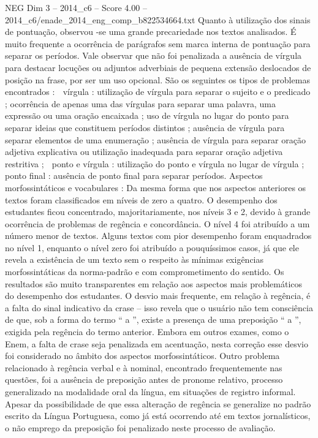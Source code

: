 \begin{textsample}{NEG Dim 3 – 2014\_c6 – Score 4.00 – 2014\_c6/enade\_2014\_eng\_comp\_b822534664.txt}
Quanto à utilização dos sinais de pontuação, observou -se uma grande precariedade nos textos analisados.
É muito frequente a ocorrência de parágrafos sem marca interna de pontuação para separar os períodos.
Vale observar que não foi penalizada a ausência de vírgula para destacar locuções ou adjuntos adverbiais de pequena extensão deslocados de posição na frase, por ser um uso opcional.
São os seguintes os tipos de problemas encontrados :  vírgula : utilização de vírgula para separar o sujeito e o predicado ; ocorrência de apenas uma das vírgulas para separar uma palavra, uma expressão ou uma oração encaixada ; uso de vírgula no lugar do ponto para separar ideias que constituem períodos distintos ; ausência de vírgula para separar elementos de uma enumeração ; ausência de vírgula para separar oração adjetiva explicativa ou utilização inadequada para separar oração adjetiva restritiva ;  ponto e vírgula : utilização do ponto e vírgula no lugar de vírgula ;  ponto final : ausência de ponto final para separar períodos.
Aspectos morfossintáticos e vocabulares : Da mesma forma que nos aspectos anteriores os textos foram classificados em níveis de zero a quatro.
O desempenho dos estudantes ficou concentrado, majoritariamente, nos níveis 3 e 2, devido à grande ocorrência de problemas de regência e concordância.
O nível 4 foi atribuído a um número menor de textos.
Alguns textos com pior desempenho foram enquadrados no nível 1, enquanto o nível zero foi atribuído a pouquíssimos casos, já que ele revela a existência de um texto sem o respeito às mínimas exigências morfossintáticas da norma-padrão e com comprometimento do sentido.
Os resultados são muito transparentes em relação aos aspectos mais problemáticos do desempenho dos estudantes.
O desvio mais frequente, em relação à regência, é a falta do sinal indicativo da crase – isso revela que o usuário não tem consciência de que, sob a forma do termo “ a ”, existe a presença de uma preposição “ a ”, exigida pela regência do termo anterior.
Embora em outros exames, como o Enem, a falta de crase seja penalizada em acentuação, nesta correção esse desvio foi considerado no âmbito dos aspectos morfossintáticos.
Outro problema relacionado à regência verbal e à nominal, encontrado frequentemente nas questões, foi a ausência de preposição antes de pronome relativo, processo generalizado na modalidade oral da língua, em situações de registro informal.
Apesar da possibilidade de que essa alteração de regência se generalize no padrão escrito da Língua Portuguesa, como já está ocorrendo até em textos jornalísticos, o não emprego da preposição foi penalizado neste processo de avaliação.

\end{textsample}
